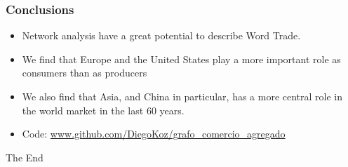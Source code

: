 \documentclass[professionalfont,fleqn]{beamer}
\begin{document}
		\begin{frame}
		\frametitle{Conclusions}
		\begin{itemize}
			\item Network analysis have a great potential to describe Word Trade.
			\item We find that Europe and the United States play a more important role as consumers than as producers
			\item We also find that Asia, and China in particular, has a more central role in the world market in the last 60 years.
			\item Code: \url{www.github.com/DiegoKoz/grafo_comercio_agregado}
		\end{itemize}
		\end{frame}
	
		
		\begin{frame}
		\Huge{\centerline{The End}}
		\end{frame}
		
		
		
\end{document}
